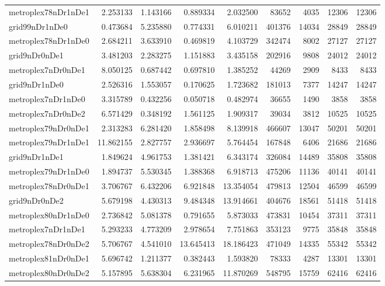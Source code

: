 \begin{longtable}{|l|r|r|r|r|r|r|r|r|}
metroplex78nDr1nDe1 & 2.253133 & 1.143166 & 0.889334 & 2.032500 & 83652 & 4035 & 12306 & 12306 \\
grid99nDr1nDe0 & 0.473684 & 5.235880 & 0.774331 & 6.010211 & 401376 & 14034 & 28849 & 28849 \\
metroplex78nDr1nDe0 & 2.684211 & 3.633910 & 0.469819 & 4.103729 & 342474 & 8002 & 27127 & 27127 \\
grid9nDr0nDe1 & 3.481203 & 2.283275 & 1.151883 & 3.435158 & 202916 & 9808 & 24012 & 24012 \\
metroplex7nDr0nDe1 & 8.050125 & 0.687442 & 0.697810 & 1.385252 & 44269 & 2909 & 8433 & 8433 \\
grid9nDr1nDe0 & 2.526316 & 1.553057 & 0.170625 & 1.723682 & 181013 & 7377 & 14247 & 14247 \\
metroplex7nDr1nDe0 & 3.315789 & 0.432256 & 0.050718 & 0.482974 & 36655 & 1490 & 3858 & 3858 \\
metroplex7nDr0nDe2 & 6.571429 & 0.348192 & 1.561125 & 1.909317 & 39034 & 3812 & 10525 & 10525 \\
metroplex79nDr0nDe1 & 2.313283 & 6.281420 & 1.858498 & 8.139918 & 466607 & 13047 & 50201 & 50201 \\
metroplex79nDr1nDe1 & 11.862155 & 2.827757 & 2.936697 & 5.764454 & 167848 & 6406 & 21686 & 21686 \\
grid9nDr1nDe1 & 1.849624 & 4.961753 & 1.381421 & 6.343174 & 326084 & 14489 & 35808 & 35808 \\
metroplex79nDr1nDe0 & 1.894737 & 5.530345 & 1.388368 & 6.918713 & 475206 & 11136 & 40141 & 40141 \\
metroplex78nDr0nDe1 & 3.706767 & 6.432206 & 6.921848 & 13.354054 & 479813 & 12504 & 46599 & 46599 \\
grid9nDr0nDe2 & 5.679198 & 4.430313 & 9.484348 & 13.914661 & 404676 & 18561 & 51418 & 51418 \\
metroplex80nDr1nDe0 & 2.736842 & 5.081378 & 0.791655 & 5.873033 & 473831 & 10454 & 37311 & 37311 \\
metroplex7nDr1nDe1 & 5.293233 & 4.773209 & 2.978654 & 7.751863 & 353123 & 9775 & 35848 & 35848 \\
metroplex78nDr0nDe2 & 5.706767 & 4.541010 & 13.645413 & 18.186423 & 471049 & 14335 & 55342 & 55342 \\
metroplex81nDr0nDe1 & 5.696742 & 1.211377 & 0.382443 & 1.593820 & 78333 & 4287 & 13301 & 13301 \\
metroplex80nDr0nDe2 & 5.157895 & 5.638304 & 6.231965 & 11.870269 & 548795 & 15759 & 62416 & 62416 \\

\end{longtable}
